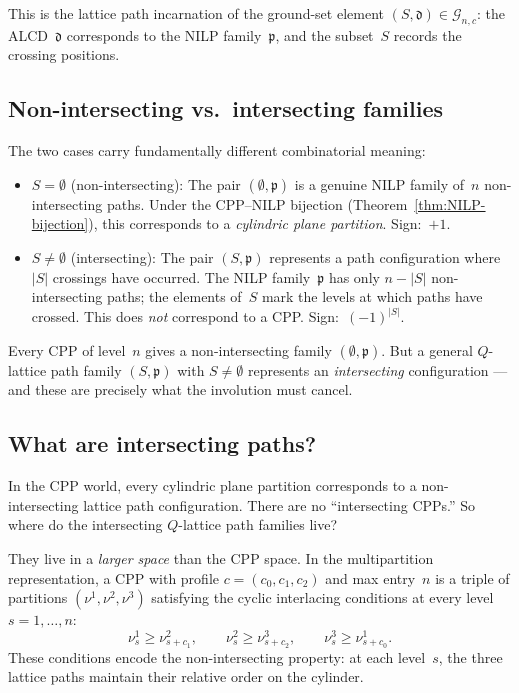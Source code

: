 \documentclass[11pt]{article}
\theoremstyle{plain}
\theoremstyle{definition}
\begin{document}
This is the lattice path incarnation of the ground-set
element $(S, \mathfrak{d}) \in \mathcal{G}_{n,c}$: the
ALCD~$\mathfrak{d}$ corresponds to the NILP
family~$\mathfrak{p}$, and the subset~$S$ records the
crossing positions.


\subsection{Non-intersecting vs.\ intersecting families}

The two cases carry fundamentally different combinatorial
meaning:

\begin{itemize}
  \item \textbf{$S = \emptyset$} (non-intersecting):
    The pair $(\emptyset, \mathfrak{p})$ is a genuine NILP
    family of~$n$ non-intersecting paths.  Under the
    CPP--NILP bijection (Theorem~\ref{thm:NILP-bijection}),
    this corresponds to a \emph{cylindric plane partition}.
    Sign:~$+1$.

  \item \textbf{$S \neq \emptyset$} (intersecting):
    The pair $(S, \mathfrak{p})$ represents a path
    configuration where $|S|$ crossings have occurred.
    The NILP family~$\mathfrak{p}$ has only $n - |S|$
    non-intersecting paths; the elements of~$S$ mark the
    levels at which paths have crossed.  This does
    \emph{not} correspond to a CPP\@.
    Sign:~$(-1)^{|S|}$.
\end{itemize}

Every CPP of level~$n$ gives a non-intersecting family
$(\emptyset, \mathfrak{p})$.  But a general $Q$-lattice
path family $(S, \mathfrak{p})$ with $S \neq \emptyset$
represents an \emph{intersecting} configuration --- and
these are precisely what the involution must cancel.


\subsection{What are intersecting paths?}
\label{sec:what-intersecting}

In the CPP world, every cylindric plane partition corresponds to a
non-intersecting lattice path configuration.  There are no
``intersecting CPPs.''  So where do the intersecting $Q$-lattice
path families live?

They live in a \emph{larger space} than the CPP space.
In the multipartition representation, a CPP with profile
$c = (c_0, c_1, c_2)$ and max entry~$n$ is a triple of partitions
$(\nu^1, \nu^2, \nu^3)$ satisfying the cyclic interlacing conditions
at every level $s = 1, \ldots, n$:
\begin{equation}\label{eq:interlacing}
  \nu^1_s \geq \nu^2_{s+c_1}, \qquad
  \nu^2_s \geq \nu^3_{s+c_2}, \qquad
  \nu^3_s \geq \nu^1_{s+c_0}.
\end{equation}
These conditions encode the non-intersecting property: at each
level~$s$, the three lattice paths maintain their relative order on
the cylinder.
\end{document}
